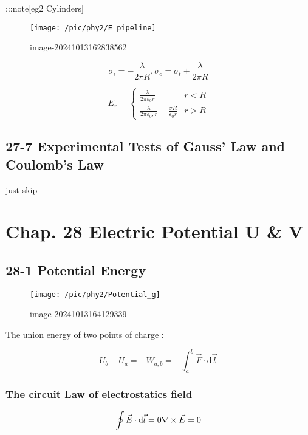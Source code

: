 \documentclass[
]{article}
\begin{document}
:::note{[}eg2 Cylinders{]}

\begin{figure}
\centering
\texttt{[image: /pic/phy2/E\_pipeline]}
\caption{image-20241013162838562}
\end{figure}

\[
\sigma _i =-\frac{\lambda }{2\pi R},\sigma _o = \sigma_t+\frac{\lambda }{2\pi R}
\]

\[
E_r=\begin{cases}\frac{\lambda }{2\pi \varepsilon _0 r}&r<R\\\frac{\lambda }{2\pi \varepsilon _0,r}+\frac{\sigma R}{\varepsilon _0r} &r>R\end{cases}
\]

\hypertarget{experimental-tests-of-gauss-law-and-coulombs-law}{%
\subsection{27-7 Experimental Tests of Gauss' Law and Coulomb's
Law}\label{experimental-tests-of-gauss-law-and-coulombs-law}}

just skip

\hypertarget{chap.-28-electric-potential-u-v}{%
\section{Chap. 28 Electric Potential U \&
V}\label{chap.-28-electric-potential-u-v}}

\hypertarget{potential-energy}{%
\subsection{28-1 Potential Energy}\label{potential-energy}}

\begin{figure}
\centering
\texttt{[image: /pic/phy2/Potential\_g]}
\caption{image-20241013164129339}
\end{figure}

The union energy of two points of charge :

\[
U_b-U_a=-W_{a,b}=-\int_{a}^b \vec F\cdot \mathrm d\vec l
\]

\hypertarget{the-circuit-law-of-electrostatics-field}{%
\subsubsection{The circuit Law of electrostatics
field}\label{the-circuit-law-of-electrostatics-field}}

\[
\oint \vec E\cdot \mathrm d\vec l =0\\\nabla \times \vec E=0
\]
\end{document}
